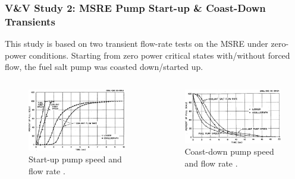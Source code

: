\begin{frame}
  \frametitle{V\&V Study 2: MSRE Pump Start-up \& Coast-Down Transients}
  This study is based on two transient flow-rate tests on the MSRE under zero-power conditions.
  Starting from zero power critical states with/without forced flow, the fuel salt pump was coasted
  down/started up.
  \begin{columns}
    \column[t]{5.5cm}
    \begin{figure}
      \centering
      \includegraphics[width=.8\columnwidth]{images/msre-startup}
      \caption{Start-up pump speed and flow rate \cite{prince_zero-power_1968}.}
    \end{figure}
    \column[t]{5.5cm}
    \begin{figure}
      \centering
      \includegraphics[width=.95\columnwidth]{images/msre-coastdown}
      \caption{Coast-down pump speed and flow rate \cite{prince_zero-power_1968}.}
    \end{figure}
  \end{columns}
\end{frame}

